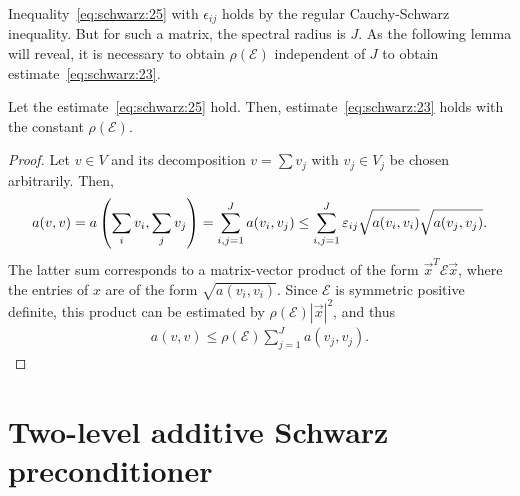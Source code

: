 \begin{note}
  Inequality~\eqref{eq:schwarz:25} with $\epsilon_{ij}$ holds by the
  regular Cauchy-Schwarz inequality. But for such a matrix, the
  spectral radius is $J$. As the following lemma will reveal, it is
  necessary to obtain $\rho(\mathcal E)$ independent of $J$ to obtain
  estimate~\eqref{eq:schwarz:23}.
\end{note}

\begin{lemma}
  \label{lemma:schwarz:7}
  Let the estimate~\eqref{eq:schwarz:25} hold. Then,
  estimate~\eqref{eq:schwarz:23} holds with the constant
  $\rho(\mathcal E)$.
\end{lemma}

\begin{proof}
  Let $v\in V$ and its decomposition $v=\sum v_j$ with $v_j\in V_j$ be
  chosen arbitrarily. Then,
  \begin{multline*}
    a(v,v)
    = a\left(\sum_i v_i, \sum_j v_j\right)
    = \sum_{i,j=1}^J a(v_i, v_j)
    \le \sum_{i,j=1}^J \epsilon_{ij} \sqrt{a(v_{\vphantom{j}i},v_i)} \sqrt{a(v_j,v_j)}.
  \end{multline*}
  The latter sum corresponds to a matrix-vector product of the form
  $\vec x^T \mathcal E \vec x$, where the entries of $x$ are of the
  form $\sqrt{a(v_i,v_i)}$. Since $\mathcal E$ is symmetric positive
  definite, this product can be estimated by $\rho(\mathcal E) |\vec
  x|^2$, and thus
  \begin{gather}
    \label{eq:schwarz:38}
    a(v,v) \le \rho(\mathcal E) \sum_{j=1}^J a(v_j,v_j).
  \end{gather}
\end{proof}

\section{Two-level additive Schwarz preconditioner}

